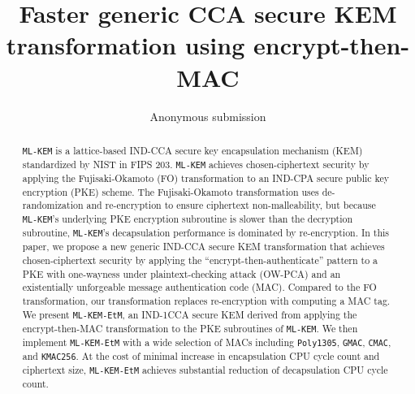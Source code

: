 \documentclass[runningheads]{llncs}
\begin{document}
\title{Faster generic CCA secure KEM transformation using encrypt-then-MAC}

\author{
    Anonymous submission
}

\institute{
}

\maketitle              %
%
\begin{abstract}
    \texttt{ML-KEM} is a lattice-based IND-CCA secure key encapsulation mechanism (KEM) standardized by NIST in FIPS 203. \texttt{ML-KEM} achieves chosen-ciphertext security by applying the Fujisaki-Okamoto (FO) transformation to an IND-CPA secure public key encryption (PKE) scheme. The Fujisaki-Okamoto transformation uses de-randomization and re-encryption to ensure ciphertext non-malleability, but because \texttt{ML-KEM}'s underlying PKE encryption subroutine is slower than the decryption subroutine, \texttt{ML-KEM}'s decapsulation performance is dominated by re-encryption. In this paper, we propose a new generic IND-CCA secure KEM transformation that achieves chosen-ciphertext security by applying the ``encrypt-then-authenticate'' pattern to a PKE with one-wayness under plaintext-checking attack (OW-PCA) and an existentially unforgeable message authentication code (MAC). Compared to the FO transformation, our transformation replaces re-encryption with computing a MAC tag. We present \texttt{ML-KEM-EtM}, an IND-1CCA secure KEM derived from applying the encrypt-then-MAC transformation to the PKE subroutines of \texttt{ML-KEM}. We then implement \texttt{ML-KEM-EtM} with a wide selection of MACs including \texttt{Poly1305}, \texttt{\texttt{GMAC}}, \texttt{\texttt{CMAC}}, and \texttt{\texttt{KMAC256}}. At the cost of minimal increase in encapsulation CPU cycle count and ciphertext size, \texttt{ML-KEM-EtM} achieves substantial reduction of decapsulation CPU cycle count.
\end{abstract}
\end{document}
